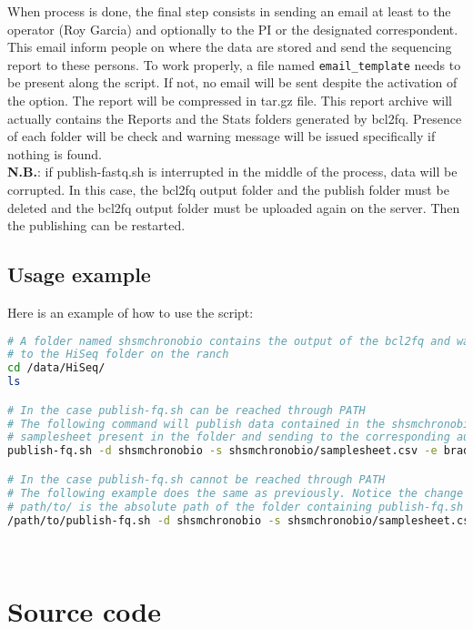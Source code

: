 \documentclass[11pt]{report}
\begin{document}
When process is done, the final step consists in sending an email at least to the operator (Roy Garcia) and optionally to the PI or the designated correspondent. This email inform people on where the data are stored and send the sequencing report to these persons. To work properly, a file named \verb|email_template| needs to be present along the script. If not, no email will be sent despite the activation of the option. The report will be compressed in tar.gz file. This report archive will actually contains the Reports and the Stats folders generated by bcl2fq. Presence of each folder will be check and warning message will be issued specifically if nothing is found.
~\\

\noindent \textbf{N.B.}: if publish-fastq.sh is interrupted in the middle of the process, data will be corrupted. In this case, the bcl2fq output folder and the publish folder must be deleted and the bcl2fq output folder must be uploaded again on the server. Then the publishing can be restarted.


 \section{Usage example}

Here is an example of how to use the script:
\begin{lstlisting}[language=bash]
# A folder named shsmchronobio contains the output of the bcl2fq and was uploaded
# to the HiSeq folder on the ranch
cd /data/HiSeq/
ls

# In the case publish-fq.sh can be reached through PATH
# The following command will publish data contained in the shsmchronobio using the 
# samplesheet present in the folder and sending to the corresponding author
publish-fq.sh -d shsmchronobio -s shsmchronobio/samplesheet.csv -e brad

# In the case publish-fq.sh cannot be reached through PATH
# The following example does the same as previously. Notice the change at the beginning:
# path/to/ is the absolute path of the folder containing publish-fq.sh
/path/to/publish-fq.sh -d shsmchronobio -s shsmchronobio/samplesheet.csv -e brad
\end{lstlisting}
~\\


 \chapter*{Source code}
\setcounter{section}{0}
\end{document}
